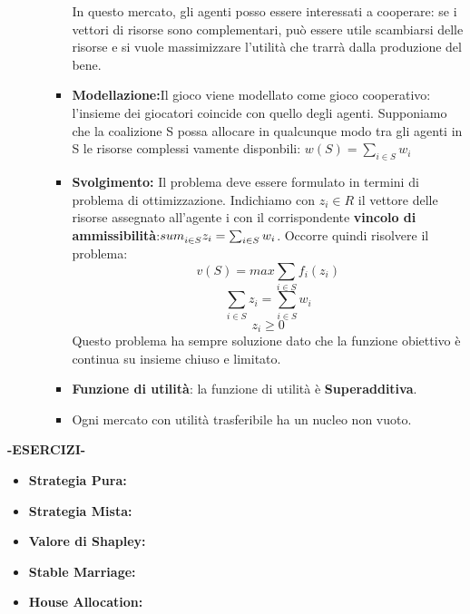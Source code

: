 \documentclass{article}
\theoremstyle{definition}
\theoremstyle{remark}
\begin{document}
\begin{itemize}
\begin{itemize}
\begin{itemize}
            In questo mercato, gli agenti posso essere interessati a cooperare: se i vettori di risorse sono complementari, può essere utile scambiarsi delle risorse e si vuole massimizzare l'utilità che trarrà dalla produzione del bene.
            \item\textbf{Modellazione:}Il gioco viene modellato come gioco cooperativo: l'insieme dei giocatori coincide con quello degli agenti. Supponiamo che la coalizione S possa allocare in qualcunque modo tra gli agenti in S le risorse complessi
            vamente disponbili: \(w(S)=\sum_{i\in S}w_i\)
            \item\textbf{Svolgimento:} Il problema deve essere formulato in termini di problema di ottimizzazione. Indichiamo con \(z_i\in R\) il vettore delle risorse assegnato all'agente i con il corrispondente \textbf{vincolo di ammissibilità}:\(\\sum_{i\in S}^{}z_i=\sum_{i\in S}w_i\).\newline
            Occorre quindi risolvere il problema:
            \begin{equation}
                v(S)=max \sum_{i\in S}f_i(z_i)
            \end{equation}
            \begin{equation}
                \sum_{i\in S}z_i=\sum_{i\in S}w_i
            \end{equation}
            \begin{equation}
                z_i\geq 0
            \end{equation}
            Questo problema ha sempre soluzione dato che la funzione obiettivo è continua su insieme chiuso e limitato.
            \item \textbf{Funzione di utilità}: la funzione di utilità è \textbf{Superadditiva}.
            \item Ogni mercato con utilità trasferibile ha un nucleo non vuoto.
        \end{itemize}
    \end{itemize}
\end{itemize}
\begin{center}
    \textbf{-ESERCIZI-}
\end{center}
\begin{itemize}
    \item \textbf{Strategia Pura:}
    
    \item \textbf{Strategia Mista:}
    \item \textbf{Valore di Shapley:}
    \item \textbf{Stable Marriage:}
    \item \textbf{House Allocation:}
\end{itemize}
\end{document}
